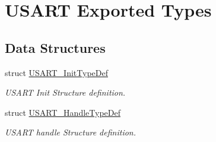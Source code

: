 \hypertarget{group___u_s_a_r_t___exported___types}{}\section{U\+S\+A\+RT Exported Types}
\label{group___u_s_a_r_t___exported___types}
\subsection*{Data Structures}
\begin{DoxyCompactItemize}
\item 
struct \hyperlink{struct_u_s_a_r_t___init_type_def}{U\+S\+A\+R\+T\+\_\+\+Init\+Type\+Def}
\begin{DoxyCompactList}\small\item\em U\+S\+A\+RT Init Structure definition. \end{DoxyCompactList}\item 
struct \hyperlink{struct_u_s_a_r_t___handle_type_def}{U\+S\+A\+R\+T\+\_\+\+Handle\+Type\+Def}
\begin{DoxyCompactList}\small\item\em U\+S\+A\+RT handle Structure definition. \end{DoxyCompactList}\end{DoxyCompactItemize}
